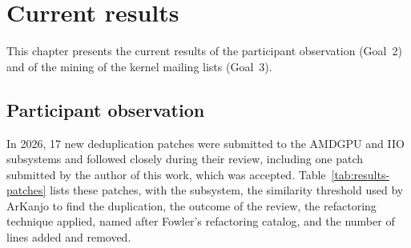 \chapter{Current results}
\label{chap:results}

This chapter presents the current results of the participant observation (Goal~2) and of the mining of the kernel mailing lists (Goal~3).

\section{Participant observation}
\label{sec:results-observation}

In 2026, 17 new deduplication patches were submitted to the AMDGPU and IIO subsystems and followed closely during their review, including one patch submitted by the author of this work, which was accepted. Table~\ref{tab:results-patches} lists these patches, with the subsystem, the similarity threshold used by ArKanjo to find the duplication, the outcome of the review, the refactoring technique applied, named after Fowler's refactoring catalog, and the number of lines added and removed.

